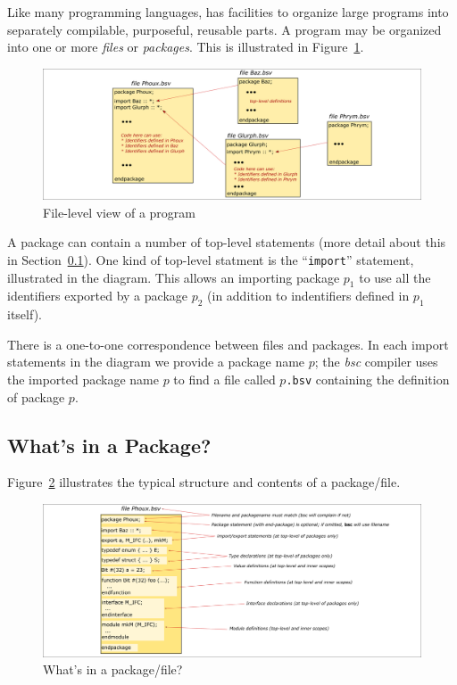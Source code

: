 
Like many programming languages, {\BSV} has facilities to organize large
programs into separately compilable, purposeful, reusable parts.  A
{\BSV} program may be organized into one or more \emph{files} or
\emph{packages}.  This is illustrated in
Figure~\ref{Fig_BSV_program_structure}.
\begin{figure}[htbp]
  \centerline{\includegraphics[width=6in,angle=0]{Figures/Fig_BSV_program_structure}}
  \caption{\label{Fig_BSV_program_structure}
           File-level view of a {\BSV} program}
\end{figure}

A package can contain a number of top-level statements (more detail
about this in Section~\ref{Sec_package_contents}).  One kind of
top-level statment is the ``\verb|import|'' statement, illustrated in
the diagram.  This allows an importing package $p_1$ to use all the
identifiers exported by a package $p_2$ (in addition to indentifiers
defined in $p_1$ itself).

There is a one-to-one correspondence between files and packages.  In
each import statements in the diagram we provide a package name $p$;
the \emph{bsc} compiler uses the imported package name $p$ to find a
file called $p$\verb|.bsv| containing the definition of package $p$.


\subsection{What's in a Package?}

\label{Sec_package_contents}

Figure~\ref{Fig_BSV_Package} illustrates the typical
structure and contents of a package/file.
\begin{figure}[htbp]
  \centerline{\includegraphics[width=6in,angle=0]{Figures/Fig_BSV_Package}}
  \caption{\label{Fig_BSV_Package}
           What's in a {\BSV} package/file?}
\end{figure}


